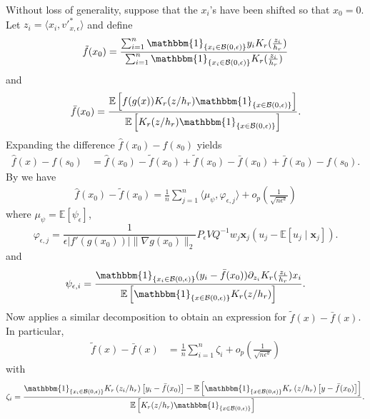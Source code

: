 \documentclass[11pt]{article}
\begin{document}
\begin{appendices}
Without loss of generality, suppose that the $x_i$'s have been shifted so that $x_0 = 0$. Let $z_i = \langle x_i, v'^*_{x, \epsilon}\rangle$ and define
\begin{equation}
\tilde{f}(x_0) = \frac{\sum_{i=1}^n \mathbbm{1}_{\{x_i\in \mathcal{B}(0, \epsilon)\}}y_iK_r(\frac{z_i}{h_r})}{\sum_{i=1}^n \mathbbm{1}_{\{x_i\in \mathcal{B}(0, \epsilon)\}}K_r(\frac{z_i}{h_r})} \label{eq: ftilde}
\end{equation}
and
\begin{equation}\bar{f}(x_0) = \frac{\mathbb{E}\left[f(g(x))K_r(z/h_r)\mathbbm{1}_{\{x\in \mathcal{B}(0, \epsilon)\}}\right]}{\mathbb{E}\left[K_r(z/h_r)\mathbbm{1}_{\{x\in \mathcal{B}(0, \epsilon)\}}\right]}. \label{eq: fbar}
\end{equation}
 Expanding the difference $\hat{f}(x_0) - f(s_0)$ yields
\begin{align}
    \hat{f}(x) - f(s_0) &= \hat{f}(x_0) - \tilde{f}(x_0) + 
    \tilde{f}(x_0) - \bar{f}(x_0) + \bar{f}(x_0) - f(s_0).
\end{align}
By  we have
\begin{align}
    \hat{f}(x_0) - \tilde{f}(x_0) = \frac{1}{n}\sum_{j = 1}^n\langle\mu_{\psi}, \varphi_{\epsilon, j}\rangle + o_p\left(\frac{1}{\sqrt{n\epsilon^d}}\right)
\end{align}
where $\mu_{\psi} = \mathbb{E}[\psi_{\epsilon}]$,  
\[
\varphi_{\epsilon,j}
=
\frac{1}{\epsilon |f'(g(x_0))|\|\nabla g(x_0)\|_2}
P_{\epsilon}VQ^{-1}w_j\boldsymbol{x}_j\left(u_j-\mathbb{E}[u_j\mid \boldsymbol{x}_j]\right).
\]
and
\[\psi_{\epsilon, i} = \frac{\mathbbm{1}_{\{x_i \in \mathcal{B}(0, \epsilon)\}}(y_i - \bar{f}(x_0))\partial_{z_i}K_r(\frac{z_i}{h_r})x_i}{\mathbb{E}\left[\mathbbm{1}_{\{x \in \mathcal{B}(0, \epsilon)\}}K_r(z/h_r)\right]}.\]
Now  applies a similar decomposition to obtain an expression for $\tilde{f}(x) - \bar{f}(x)$. In particular,
\begin{align*}
    \tilde{f}(x) - \bar{f}(x) &= \frac{1}{n}\sum_{i = 1}^n\zeta_i + o_p\left(\frac{1}{\sqrt{n\epsilon^{d}}}\right) 
\end{align*}
with 
\begin{equation*}
    \zeta_i = \frac{\mathbbm{1}_{\{x_i \in \mathcal{B}(0, \epsilon)\}}K_r\left(z_i/h_r\right)\left[y_i - \bar{f}(x_0)\right] - \mathbb{E}\left[\mathbbm{1}_{\{x \in \mathcal{B}(0, \epsilon)\}}K_r\left(z/h_r\right)\left[y - \bar{f}(x_0)\right]\right]}{\mathbb{E}\left[K_r(z/h_r)\mathbbm{1}_{\{x\in \mathcal{B}(0, \epsilon)\}}\right]}.

\end{equation*}
\end{appendices}
\end{document}
